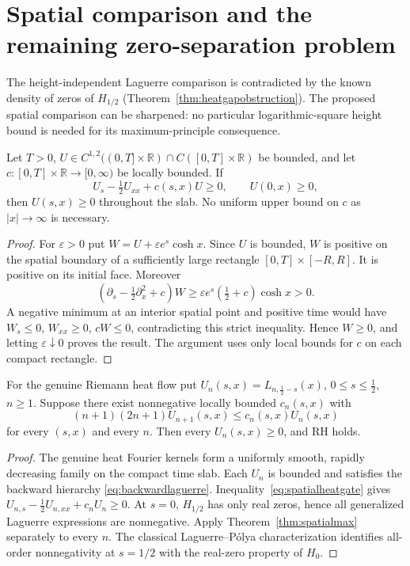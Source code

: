 \section{Spatial comparison and the remaining zero-separation problem}
\label{sec:spatialheat}
The height-independent Laguerre comparison is contradicted by the
known density of zeros of $H_{1/2}$
(Theorem~\ref{thm:heatgapobstruction}). The proposed spatial
comparison can be sharpened: no particular logarithmic-square
height bound is needed for its maximum-principle consequence.

\begin{theorem}
\label{thm:spatialmax}
Let $T>0$, $U\in C^{1,2}((0,T]\times\mathbb R)
\cap C([0,T]\times\mathbb R)$ be bounded, and let
$c:[0,T]\times\mathbb R\to[0,\infty)$ be locally bounded.
If
\begin{equation}
U_s-\tfrac12U_{xx}+c(s,x)U\ge0,\qquad
U(0,x)\ge0, \label{eq:spatialmax}
\end{equation}
then $U(s,x)\ge0$ throughout the slab.
No uniform upper bound on $c$ as $|x|\to\infty$
is necessary.
\end{theorem}
\begin{proof}
For $\varepsilon>0$ put
$W=U+\varepsilon e^s\cosh x$.
Since $U$ is bounded, $W$ is positive
on the spatial boundary of a sufficiently
large rectangle $[0,T]\times[-R,R]$.
It is positive on its initial face. Moreover
\[
(\partial_s-\tfrac12\partial_x^2+c)W
\ge\varepsilon e^s(\tfrac12+c)\cosh x>0.
\]
A negative minimum at an interior spatial
point and positive time would have
$W_s\le0$, $W_{xx}\ge0$, $cW\le0$,
contradicting this strict inequality.
Hence $W\ge0$, and letting
$\varepsilon\downarrow0$ proves the result.
The argument uses only local bounds for $c$
on each compact rectangle.
\end{proof}

\begin{corollary}
\label{cor:spatialRH}
For the genuine Riemann heat flow put
$U_n(s,x)=L_{n,\frac12-s}(x)$,
$0\le s\le\frac12$, $n\ge1$.
Suppose there exist nonnegative
locally bounded $c_n(s,x)$ with
\begin{equation}
\boxed{
(n+1)(2n+1)U_{n+1}(s,x)
\le c_n(s,x)U_n(s,x)}
\label{eq:spatialheatgate}
\end{equation}
for every $(s,x)$ and every $n$.
Then every $U_n(s,x)\ge0$, and RH holds.
\end{corollary}
\begin{proof}
The genuine heat Fourier kernels form a
uniformly smooth, rapidly decreasing family
on the compact time slab. Each $U_n$ is
bounded and satisfies the backward hierarchy
\eqref{eq:backwardlaguerre}.
Inequality~\eqref{eq:spatialheatgate} gives
$U_{n,s}-\frac12U_{n,xx}+c_nU_n\ge0$.
At $s=0$, $H_{1/2}$ has only real zeros,
hence all generalized Laguerre expressions
are nonnegative. Apply
Theorem~\ref{thm:spatialmax} separately
to every $n$. The classical
Laguerre--P\'olya characterization
identifies all-order nonnegativity at
$s=1/2$ with the real-zero property of $H_0$.
\end{proof}

